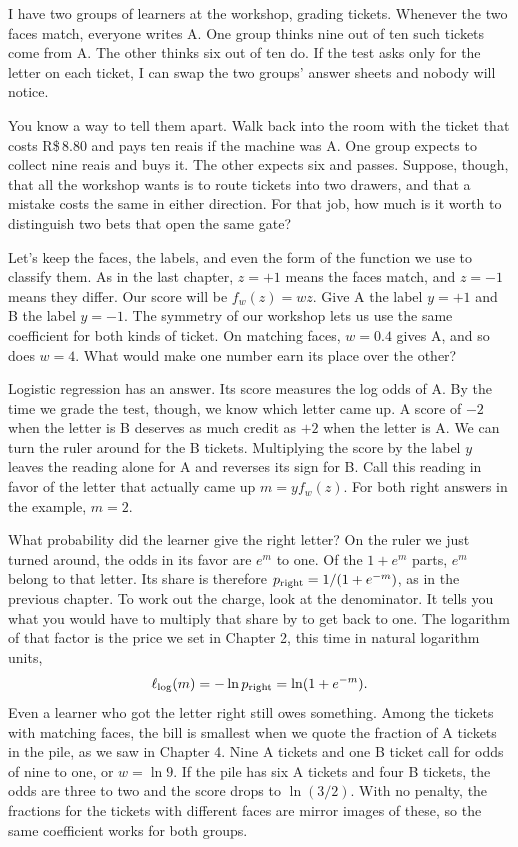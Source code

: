 I have two groups of learners at the workshop, grading tickets. Whenever the two faces match, everyone writes A. One group thinks nine out of ten such tickets come from A. The other thinks six out of ten do. If the test asks only for the letter on each ticket, I can swap the two groups' answer sheets and nobody will notice.

You know a way to tell them apart. Walk back into the room with the ticket that costs R\$\,8.80 and pays ten reais if the machine was A. One group expects to collect nine reais and buys it. The other expects six and passes. Suppose, though, that all the workshop wants is to route tickets into two drawers, and that a mistake costs the same in either direction. For that job, how much is it worth to distinguish two bets that open the same gate?

Let's keep the faces, the labels, and even the form of the function we use to classify them. As in the last chapter, $z=+1$ means the faces match, and $z=-1$ means they differ. Our score will be $f_w(z)=wz$. Give A the label $y=+1$ and B the label $y=-1$. The symmetry of our workshop lets us use the same coefficient for both kinds of ticket. On matching faces, $w=0.4$ gives A, and so does $w=4$. What would make one number earn its place over the other?

Logistic regression has an answer. Its score measures the log odds of A. By the time we grade the test, though, we know which letter came up. A score of $-2$ when the letter is B deserves as much credit as $+2$ when the letter is A. We can turn the ruler around for the B tickets. Multiplying the score by the label $y$ leaves the reading alone for A and reverses its sign for B. Call this reading in favor of the letter that actually came up $m=yf_w(z)$. For both right answers in the example, $m=2$.

What probability did the learner give the right letter? On the ruler we just turned around, the odds in its favor are $e^m$ to one. Of the $1+e^m$ parts, $e^m$ belong to that letter. Its share is therefore $p_{\rm right}=1/(1+e^{-m})$, as in the previous chapter. To work out the charge, look at the denominator. It tells you what you would have to multiply that share by to get back to one. The logarithm of that factor is the price we set in Chapter 2, this time in natural logarithm units,
\[
             \ell_{\rm log}(m)=-\ln p_{\rm right}=\ln(1+e^{-m}).
\]
Even a learner who got the letter right still owes something. Among the tickets with matching faces, the bill is smallest when we quote the fraction of A tickets in the pile, as we saw in Chapter 4. Nine A tickets and one B ticket call for odds of nine to one, or $w=\ln 9$. If the pile has six A tickets and four B tickets, the odds are three to two and the score drops to $\ln(3/2)$. With no penalty, the fractions for the tickets with different faces are mirror images of these, so the same coefficient works for both groups.


